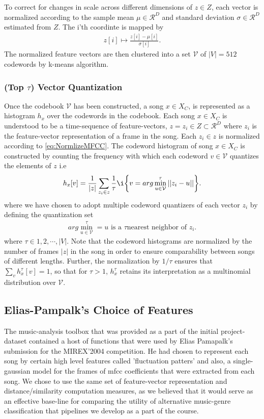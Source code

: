\documentclass[12pt]{article}
\begin{document}
To correct for changes in scale across different dimensions of $ z \in Z$, each vector is normalized according to the sample mean $\mu \in \mathcal{R}^D$ and standard deviation $\sigma \in \mathcal{R}^D$ estimated from $Z$. The i'th coordinte is mapped by
\begin{align}
z[i] \mapsto \frac{z[i] - \mu[i]}{\sigma[i]}. \label{eq:NormlizeMFCC}
\end{align}The normalized feature vectors are then clustered into a set $\mathcal{V}$ of $|V| = 512$ codewords by k-means algorithm.

\subsubsection{(Top $\tau$) Vector Quantization}
Once the codebook $\mathcal{V}$ has been constructed, a song $x \in X_C$, is represented as a histogram $h_x$ over the codewords in the codebook. Each song $x \in X_C$ is understood to be a time-sequence of feature-vectors, $ z = {z_i} \in Z \subset \mathcal{R}^D$ where $z_i$ is the feature-vector representation of a frame in the song. Each $ z_i \in z$ is normalized according to \eqref{eq:NormlizeMFCC}. The codeword histogram of song $x \in X_C$ is constructed by counting the frequency with which each codeword $v \in \mathcal{V}$ quantizes the elements of $z$ i.e
\begin{align}
h_x[v] = \frac{1}{|z|} \sum_{z_i \in z} \frac{1}{\tau}\i\bigg\lbrace v = arg\min_{u \in \mathcal{V}}^{\tau}||z_i - u|| \bigg\rbrace. \label{eq:wc_Hist_Defn}
\end{align}
where we have chosen to adopt multiple codeword quantizers of each vector $z_i$ by defining the quantization set
\begin{align}
arg\min_{u \in \mathcal{V}}^{\tau} = {u \text{ is a } \tau \text{nearest neighbor of }z_i}. \label{eq:TauQuantize}
\end{align}
where $\tau \in {1,2,\cdots, |V|}.$
Note that the codeword histograms are normalized by the number of frames $|z|$ in the song in order to ensure comparability between songs of different lengths. Further, the normalization by $1/\tau$ ensures that $\sum_v h_x^{\tau}[v] = 1$, so that for $\tau > 1$, $h_x^{\tau}$ retains its interpretation as a multinomial distribution over $\mathcal{V}$.


\subsection{Elias-Pampalk's Choice of Features}
The music-analysis toolbox that was provided as a part of the initial project-dataset contained a host of functions that were used by Elias Pamapalk's submission for the MIREX'2004 competition. He had chosen to represent each song by certain high level features called 'fluctuation patters' and also, a single-gaussian model for the frames of mfcc coefficients that were extracted from each song. 
We chose to use the same set of feature-vector representation and distance/similarity computation measures, as we believed that it would serve as an effective base-line for comparing the utility of alternative music-genre classification that pipelines we develop as a part of the course. 
\end{document}
